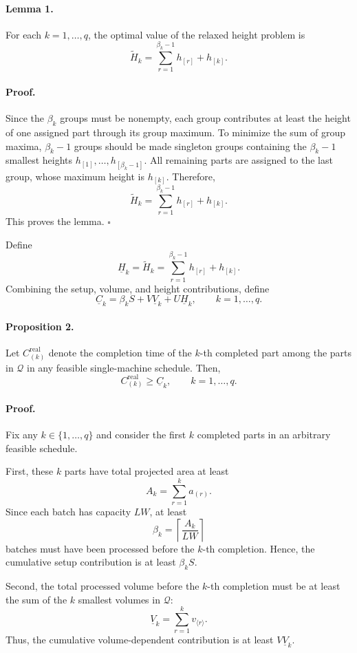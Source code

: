 \documentclass[letterpaper, 10 pt, conference]{ieeeconf}  %
\newcounter{lemma}
\begin{document}
\paragraph*{Lemma 1.}
For each $k=1,\dots,q$, the optimal value of the relaxed height problem is
\[
\widetilde{H}_k
=
\sum_{r=1}^{\beta_k-1}h_{[r]}+h_{[k]}.
\]

\paragraph*{Proof.}
Since the $\beta_k$ groups must be nonempty, each group contributes at least
the height of one assigned part through its group maximum. To minimize the
sum of group maxima, $\beta_k-1$ groups should be made singleton groups
containing the $\beta_k-1$ smallest heights
$h_{[1]},\dots,h_{[\beta_k-1]}$. All remaining parts are assigned to the last
group, whose maximum height is $h_{[k]}$. Therefore,
\[
\widetilde{H}_k
=
\sum_{r=1}^{\beta_k-1}h_{[r]}+h_{[k]}.
\]
This proves the lemma.
\hfill $\square$

Define
\[
\underline{H}_k=\widetilde{H}_k
=
\sum_{r=1}^{\beta_k-1}h_{[r]}+h_{[k]}.
\]
Combining the setup, volume, and height contributions, define
\[
\underline{C}_k
=
\beta_k S
+
V\underline{V}_k
+
U\underline{H}_k,
\qquad k=1,\dots,q.
\]

\paragraph*{Proposition 2.}
Let $C_{(k)}^{\mathrm{real}}$ denote the completion time of the $k$-th
completed part among the parts in $\mathcal{Q}$ in any feasible
single-machine schedule. Then,
\[
C_{(k)}^{\mathrm{real}}\ge \underline{C}_k,
\qquad k=1,\dots,q.
\]

\paragraph*{Proof.}
Fix any $k\in\{1,\dots,q\}$ and consider the first $k$ completed parts in an
arbitrary feasible schedule.

First, these $k$ parts have total projected area at least
\[
A_k=\sum_{r=1}^{k}a_{(r)}.
\]
Since each batch has capacity $LW$, at least
\[
\beta_k=\left\lceil\frac{A_k}{LW}\right\rceil
\]
batches must have been processed before the $k$-th completion. Hence, the
cumulative setup contribution is at least $\beta_k S$.

Second, the total processed volume before the $k$-th completion must be at
least the sum of the $k$ smallest volumes in $\mathcal{Q}$:
\[
\underline{V}_k=\sum_{r=1}^{k}v_{\langle r\rangle}.
\]
Thus, the cumulative volume-dependent contribution is at least
$V\underline{V}_k$.
\end{document}
